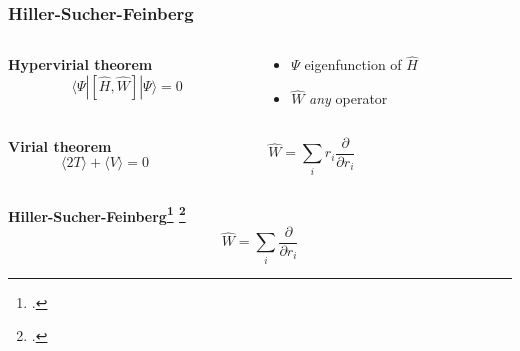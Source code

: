 \begin{frame}
\frametitle{Hiller-Sucher-Feinberg}

\begin{columns}
\begin{column}[b]{0.5\linewidth}
\centering
\textbf{Hypervirial theorem}
\begin{equation}
    \nonumber
    \langle \Psi | \left[\hat{H},\hat{W}\right] | \Psi \rangle = 0
\end{equation}
\end{column}
\begin{column}[b]{0.5\linewidth}
\begin{itemize}
\item $\Psi$ eigenfunction of $\hat{H}$
\item $\hat{W}$ \emph{any} operator
\end{itemize}
\end{column}
\end{columns}

\vspace{10mm}

\begin{columns}
\begin{column}[b]{0.5\linewidth}
\centering
\textbf{Virial theorem}
\begin{equation}
    \nonumber
    \langle2T\rangle + \langle V\rangle = 0
\end{equation}
\end{column}
\begin{column}[b]{0.4\linewidth}
\begin{equation}
    \nonumber
    \hat{W} = \sum_i r_i\frac{\partial}{\partial r_i}
\end{equation}
\end{column}
\begin{column}[b]{0.1\linewidth}
\end{column}
\end{columns}

\vspace{10mm}

\centering
\textbf{Hiller-Sucher-Feinberg\footcite{HillerSucherFeinberg_1978} \footcite{RassolovChipman_1996}}
\begin{equation}
    \nonumber
    \hat{W} = \sum_i \frac{\partial}{\partial r_i}
\end{equation}

\end{frame}

